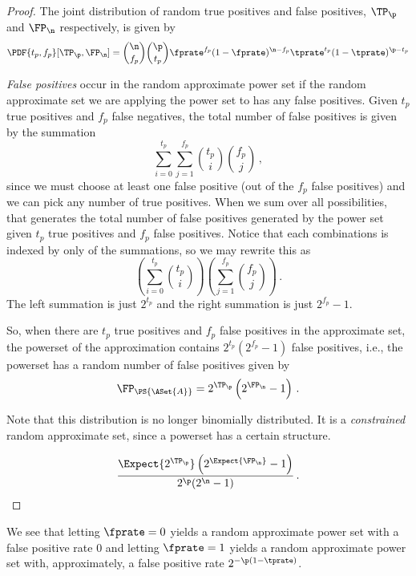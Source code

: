 \documentclass[ ../main.tex]{subfiles}
\begin{document}
\begin{proof}
	The joint distribution of random true positives and false positives, $\TP_\p$ and $\FP_\n$ respectively, is given by
	\begin{equation}
	\PDF{t_p,f_p}[\TP_\p,\FP_\n]=\binom{\n}{f_p} \binom{\p}{t_p} \fprate^{f_p}(1-\fprate)^{\n-f_p} \tprate^{t_p}(1-\tprate)^{\p-t_p}
	\end{equation}
	
	\emph{False positives} occur in the random approximate power set if the random approximate set we are applying the power set to has any false positives.
	Given $t_p$ true positives and $f_p$ false negatives, the total number of false positives is given by the summation
	\begin{equation}
	\sum_{i=0}^{t_p} \sum_{j=1}^{f_p} \binom{t_p}{i}\binom{f_p}{j}\,,
	\end{equation}
	since we must choose at least one false positive (out of the $f_p$ false positives) and we can pick any number of true positives.
	When we sum over all possibilities, that generates the total number of false positives generated by the power set given $t_p$ true positives and $f_p$ false positives.
	Notice that each combinations is indexed by only of the summations, so we may rewrite this as
	\begin{equation}
	\left(\sum_{i=0}^{t_p} \binom{t_p}{i} \right) \left(\sum_{j=1}^{f_p} \binom{f_p}{j}\right)\,.
	\end{equation}
	The left summation is just $2^{t_p}$ and the right summation is just $2^{f_p}-1$.
	
	So, when there are $t_p$ true positives and $f_p$ false positives in the approximate set, the powerset of the approximation contains $2^{t_p}(2^{f_p}-1)$ false positives, i.e., the powerset has a random number of false positives given by
	\begin{equation}
	\FP_{\PS{\ASet{A}}} = 2^{\TP_\p} \left(2^{\FP_\n} - 1\right)\,.
	\end{equation}
	
	Note that this distribution is no longer binomially distributed. It is a \emph{constrained} random approximate set, since a powerset has a certain structure.
	
	\begin{equation}
	\frac{\Expect{2^{\TP_\p}}\left(2^{\Expect{\FP_\n}}-1\right)}{2^\p(2^\n-1)}\,.
	\end{equation}
\end{proof}
We see that letting $\fprate=0$ yields a random approximate power set with a false positive rate $0$ and letting $\fprate=1$ yields a random approximate power set with, approximately, a false positive rate $2^{-\p(1-\tprate)}$.
\end{document}
